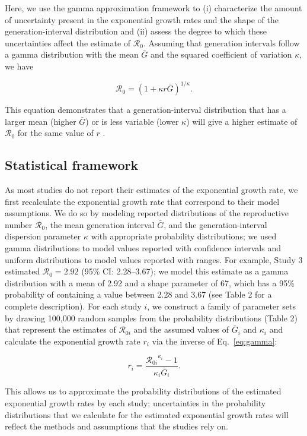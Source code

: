 \documentclass[12pt]{article}
\newcommand{\eref}[1]{Eq.~\ref{eq:#1}}
\newcommand{\Rx}[1]{\ensuremath{{\mathcal R}_{#1}}\xspace}
\newcommand{\Ro}{\ensuremath{{\mathcal R}_{0}}\xspace}
\begin{document}
Here, we use the gamma approximation framework \citep{park2019practical} to (i) characterize the amount of uncertainty present in the exponential growth rates and the shape of the generation-interval distribution and (ii) assess the degree to which these uncertainties affect the estimate of \Ro.
Assuming that generation intervals follow a gamma distribution with the mean $\bar G$ and the squared coefficient of variation $\kappa$, we have
\begin{linenomath*}
\begin{equation}
\Ro = \left(1 + \kappa r \bar{G}\right)^{1/\kappa}.
\label{eq:gamma}
\end{equation}
\end{linenomath*}
This equation demonstrates that a generation-interval distribution that has a larger mean (higher $\bar{G}$) or is less variable (lower $\kappa$) will give a higher estimate of \Ro for the same value of $r$ \citep{wallinga2007generation}.

\subsection{Statistical framework}

As most studies do not report their estimates of the exponential growth rate, we first recalculate the exponential growth rate that correspond to their model assumptions.
We do so by modeling reported distributions of the reproductive number \Ro, the mean generation interval $\bar G$, and the generation-interval dispersion parameter $\kappa$ with appropriate probability distributions;
we used gamma distributions to model values reported with confidence intervals and uniform distributions to model values reported with ranges.
For example, Study 3 estimated $\Ro = 2.92$ (95\% CI: 2.28--3.67);
we model this estimate as a gamma distribution with a mean of 2.92 and a shape parameter of 67, which has a 95\% probability of containing a value between 2.28 and 3.67 (see Table 2 for a complete description).
For each study $i$, we construct a family of parameter sets by drawing 100,000 random samples from the probability distributions (Table 2) that represent the estimates of \Rx{0i} and the assumed values of $\bar G_i$ and $\kappa_i$ and calculate the exponential growth rate $r_i$ via the inverse of \eref{gamma}:
\begin{linenomath*}
\begin{equation}
r_i = \frac{\Rx{0i}^{\kappa_i} - 1}{\kappa_i \bar{G}_i}.
\end{equation}
\end{linenomath*}
This allows us to approximate the probability distributions of the estimated exponential growth rates by each study;
uncertainties in the probability distributions that we calculate for the estimated exponential growth rates will reflect the methods and assumptions that the studies rely on.
\end{document}
